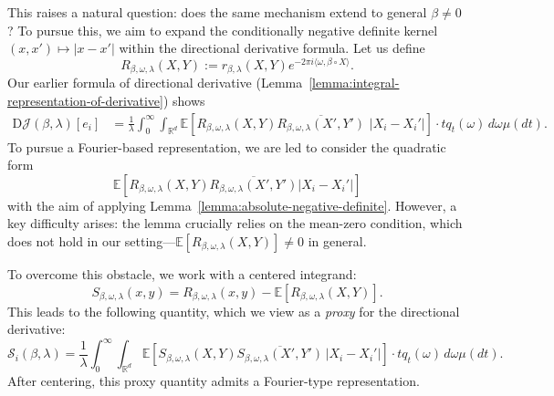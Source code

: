 \documentclass[sn-mathphys-num]{sn-jnl}%
\numberwithin{equation}{section}
\newcommand{\R}{\mathbb{R}}
\newcommand{\E}{\mathbb{E}}
\theoremstyle{thmstyleone}%
\theoremstyle{thmstyletwo}%
\theoremstyle{thmstylethree}%
\begin{document}
This raises a natural question: does the same mechanism extend to general $\beta \ne 0$?
To pursue this, we aim to expand the conditionally negative definite kernel $(x, x') \mapsto |x - x'|$ 
within the directional derivative formula. Let us define  
\begin{equation*}
R_{\beta, \omega, \lambda} (X, Y) := r_{\beta, \lambda}(X, Y) e^{-2\pi i \langle \omega, \beta \circ X\rangle}.
\end{equation*}
Our earlier formula of directional derivative (Lemma~\ref{lemma:integral-representation-of-derivative}) shows
\begin{equation*}
\begin{split} 
\mathrm{D}\mathcal{J}(\beta, \lambda)[e_i] %
&=
\frac{1}{\lambda} \int_0^\infty \int_{\R^d} 
\E\left[ R_{\beta, \omega, \lambda}(X, Y) \overline{R_{\beta, \omega, \lambda}(X', Y')} \,
\, |X_i - X_i'| \right] 
\cdot t q_t(\omega) \, d\omega  \mu(dt).
\end{split} 
\end{equation*} 
To pursue a Fourier-based representation, we are led to consider the quadratic form
\begin{equation*}
	\E\left[ R_{\beta, \omega, \lambda}(X, Y) \overline{R_{\beta, \omega, \lambda}(X', Y')}|X_i - X_i'|\right]
\end{equation*}
with the aim of applying Lemma~\ref{lemma:absolute-negative-definite}. However, a key difficulty 
arises: the lemma crucially relies on the mean-zero condition, which does not hold in 
our setting---$\E[ R_{\beta, \omega, \lambda}(X, Y) ] \ne 0$ in general.

To overcome this obstacle, we work with a centered integrand:
\begin{equation*}
	S_{\beta, \omega, \lambda}(x, y) = R_{\beta, \omega, \lambda}(x, y) - \E[R_{\beta, \omega, \lambda}(X, Y)].
\end{equation*}
This leads to the following quantity, which we view as a \emph{proxy} for the directional derivative:
\begin{equation*}
	\mathcal{S}_i (\beta, \lambda) = \frac{1}{\lambda} \int_0^\infty \int_{\R^d} 
\E\left[ S_{\beta, \omega, \lambda}(X, Y) \overline{S_{\beta, \omega, \lambda}(X', Y')}
\, |X_i - X_i'| \right] 
\cdot t q_t(\omega) \, d\omega  \mu(dt).
\end{equation*} 
After centering, this proxy quantity admits a Fourier-type representation.
 
\end{document}
